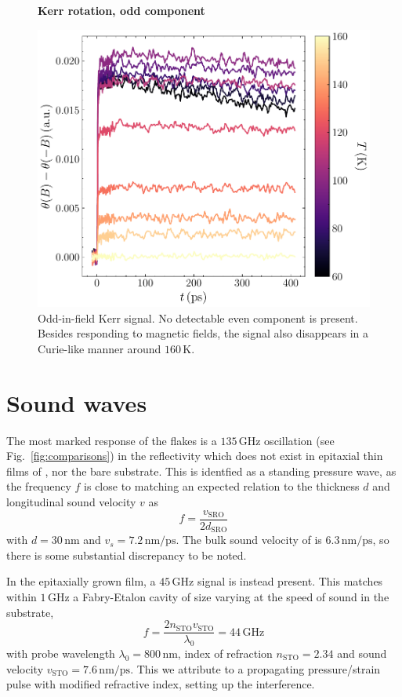 \documentclass[nobib]{tufte-handout}
\begin{document}
\begin{figure}
	\centering
	\textbf{Kerr rotation, odd component}\par\medskip
	\includegraphics[width=\linewidth]{Graphics/a_minus_b.pdf}
	\caption{Odd-in-field Kerr signal. No detectable even component is present. Besides responding to magnetic fields, the signal also disappears in a Curie-like manner around \(160\,\mathrm{K}\).}
	\label{fig:demag_dynamics}
\end{figure}

\section{Sound waves}
The most marked response of the flakes is a \( 135\,\mathrm{GHz} \) oscillation (see Fig.~\ref{fig:comparisons}) in the reflectivity which does not exist in epitaxial thin films of , nor the bare substrate. This is identfied as a standing pressure wave, as the frequency \( f \) is close to matching an expected relation to the thickness \( d \) and longitudinal sound velocity \( v \) as
\begin{equation}
	f = \frac{v_\mathrm{SRO}}{2d_\mathrm{SRO}}
\end{equation}
with \( d = 30\,\mathrm{nm} \) and \( v_s = 7.2\,\mathrm{nm/ps} \). The bulk sound velocity of  is \( 6.3\,\mathrm{nm/ps} \), so there is some substantial discrepancy to be noted.

In the epitaxially grown film, a \( 45\,\mathrm{GHz} \) signal is instead present. This matches within \( 1\,\mathrm{GHz} \) a Fabry-Etalon cavity of size varying at the speed of sound in the  substrate,
\begin{equation}
	f = \frac{2n_\mathrm{STO} v_\mathrm{STO}}{\lambda_0} =  44\,\mathrm{GHz}
\end{equation}
with probe wavelength \( \lambda_0 = 800\,\mathrm{nm} \), index of refraction \( n_\mathrm{STO} = 2.34 \) and sound velocity \( v_\mathrm{STO} = 7.6\,\mathrm{nm/ps} \). This we attribute to a propagating pressure/strain pulse with modified refractive index, setting up the interference.
\end{document}
